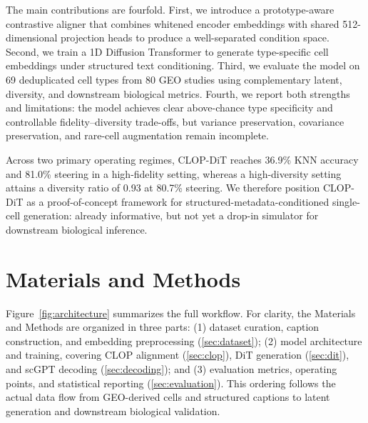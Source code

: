 \documentclass[genes,article,submit,pdftex,oneauthor]{Definitions/mdpi}
\begin{document}
The main contributions are fourfold. First, we introduce a prototype-aware contrastive aligner that combines whitened encoder embeddings with shared 512-dimensional projection heads to produce a well-separated condition space. Second, we train a 1D Diffusion Transformer to generate type-specific cell embeddings under structured text conditioning. Third, we evaluate the model on 69 deduplicated cell types from 80 GEO studies using complementary latent, diversity, and downstream biological metrics. Fourth, we report both strengths and limitations: the model achieves clear above-chance type specificity and controllable fidelity--diversity trade-offs, but variance preservation, covariance preservation, and rare-cell augmentation remain incomplete.

Across two primary operating regimes, CLOP-DiT reaches 36.9\% KNN accuracy and 81.0\% steering in a high-fidelity setting, whereas a high-diversity setting attains a diversity ratio of 0.93 at 80.7\% steering. We therefore position CLOP-DiT as a proof-of-concept framework for structured-metadata-conditioned single-cell generation: already informative, but not yet a drop-in simulator for downstream biological inference.

\section{Materials and Methods}

Figure~\ref{fig:architecture} summarizes the full workflow. For clarity, the Materials and Methods are organized in three parts: (1) dataset curation, caption construction, and embedding preprocessing (\ref{sec:dataset}); (2) model architecture and training, covering CLOP alignment (\ref{sec:clop}), DiT generation (\ref{sec:dit}), and scGPT decoding (\ref{sec:decoding}); and (3) evaluation metrics, operating points, and statistical reporting (\ref{sec:evaluation}). This ordering follows the actual data flow from GEO-derived cells and structured captions to latent generation and downstream biological validation.
\end{document}
